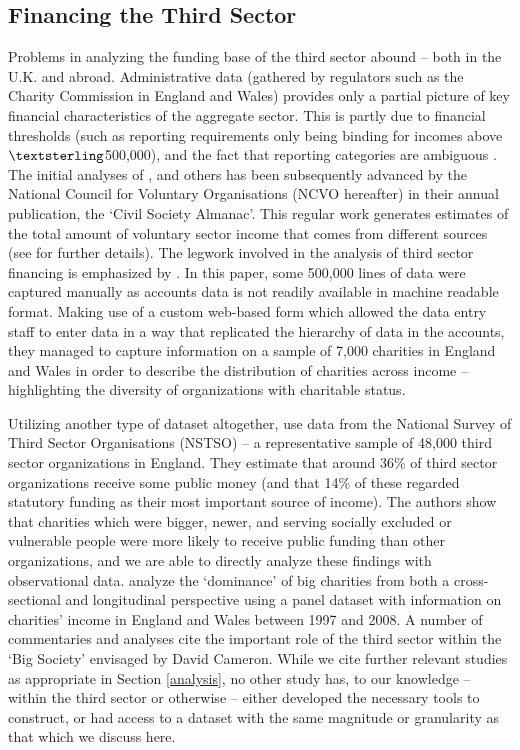 \documentclass[12pt]{article}
\begin{document}
\subsection{Financing the Third Sector}

Problems in analyzing the funding base of the third sector abound -- both in the U.K. and abroad. Administrative data (gathered by regulators such as the Charity Commission in England and Wales) provides only a partial picture of key financial characteristics of the aggregate sector. This is partly due to financial thresholds (such as reporting requirements only being binding for incomes above $\textsterling$500,000), and the fact that reporting categories are ambiguous \citep[as discussed in][]{Morgan2012}. The initial analyses of \cite{Posnett1993}, \cite{OsborneHems1995} and others has been subsequently advanced by the National Council for Voluntary Organisations (NCVO hereafter) in their annual publication, the `Civil Society Almanac'. This regular work generates estimates of the total amount of voluntary sector income that comes from different sources (see \cite{ncvo2016} for further details). The legwork involved in the analysis of third sector financing is emphasized by \cite{CliffordMohan2016}. In this paper, some 500,000 lines of data were captured manually as accounts data is not readily available in machine readable format. Making use of a custom web-based form which allowed the data entry staff to enter data in a way that replicated the hierarchy of data in the accounts, they managed to capture information on a sample of 7,000 charities in England and Wales in order to describe the distribution of charities across income -- highlighting the diversity of organizations with charitable status. 

Utilizing another type of dataset altogether, \cite{cliffordfreidamohan2010} use data from the National Survey of Third Sector Organisations (NSTSO) -- a representative sample of 48,000 third sector organizations in England. They estimate that around 36\% of third sector organizations receive some public money (and that 14\% of these regarded statutory funding as their most important source of income). The authors show that charities which were bigger, newer, and serving socially excluded or vulnerable people were more likely to receive public funding than other organizations, and we are able to directly analyze these findings with observational data. \cite{backusandclifford2013} analyze the `dominance' of big charities from both a cross-sectional and longitudinal perspective using a panel dataset with information on charities' income in England and Wales between 1997 and 2008. A number of commentaries and analyses cite the important role of the third sector within the `Big Society' envisaged by David Cameron. While we cite further relevant studies as appropriate in Section \ref{analysis}, no other study has, to our knowledge -- within the third sector or otherwise -- either developed the necessary tools to construct, or had access to a dataset with the same magnitude or granularity as that which we discuss here.
\end{document}
